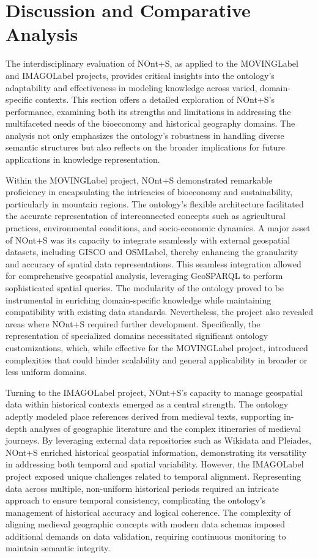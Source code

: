 \section{Discussion and Comparative Analysis}\label{VII-sec:discussion}

The interdisciplinary evaluation of NOnt+S, as applied to the \acrshort{MOVINGLabel} and \acrshort{IMAGOLabel} projects, provides critical insights into the ontology’s adaptability and effectiveness in modeling knowledge across varied, domain-specific contexts. This section offers a detailed exploration of NOnt+S’s performance, examining both its strengths and limitations in addressing the multifaceted needs of the bioeconomy and historical geography domains. The analysis not only emphasizes the ontology’s robustness in handling diverse semantic structures but also reflects on the broader implications for future applications in knowledge representation.

Within the \acrshort{MOVINGLabel} project, NOnt+S demonstrated remarkable proficiency in encapsulating the intricacies of bioeconomy and sustainability, particularly in mountain regions. The ontology’s flexible architecture facilitated the accurate representation of interconnected concepts such as agricultural practices, environmental conditions, and socio-economic dynamics. A major asset of NOnt+S was its capacity to integrate seamlessly with external geospatial datasets, including GISCO and \acrshort{OSMLabel}, thereby enhancing the granularity and accuracy of spatial data representations. This seamless integration allowed for comprehensive geospatial analysis, leveraging GeoSPARQL to perform sophisticated spatial queries. The modularity of the ontology proved to be instrumental in enriching domain-specific knowledge while maintaining compatibility with existing data standards. Nevertheless, the project also revealed areas where NOnt+S required further development. Specifically, the representation of specialized domains necessitated significant ontology customizations, which, while effective for the \acrshort{MOVINGLabel} project, introduced complexities that could hinder scalability and general applicability in broader or less uniform domains.

Turning to the \acrshort{IMAGOLabel} project, NOnt+S’s capacity to manage geospatial data within historical contexts emerged as a central strength. The ontology adeptly modeled place references derived from medieval texts, supporting in-depth analyses of geographic literature and the complex itineraries of medieval journeys. By leveraging external data repositories such as Wikidata and Pleiades, NOnt+S enriched historical geospatial information, demonstrating its versatility in addressing both temporal and spatial variability. However, the \acrshort{IMAGOLabel} project exposed unique challenges related to temporal alignment. Representing data across multiple, non-uniform historical periods required an intricate approach to ensure temporal consistency, complicating the ontology’s management of historical accuracy and logical coherence. The complexity of aligning medieval geographic concepts with modern data schemas imposed additional demands on data validation, requiring continuous monitoring to maintain semantic integrity.

